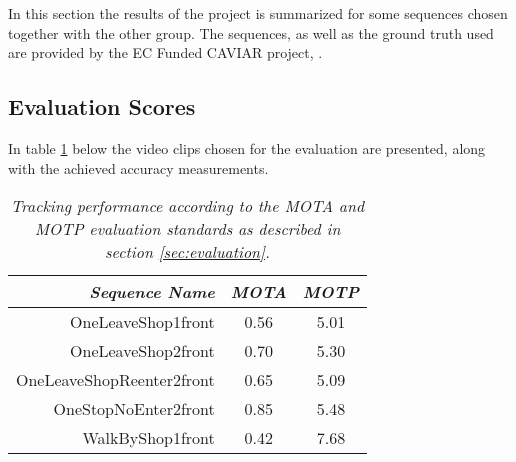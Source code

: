 In this section the results of the project is summarized for some sequences chosen together with the other group. The sequences, as well as the ground truth used are provided by the EC Funded CAVIAR project, \cite{CAVIAR}.

\subsection{Evaluation Scores}
In table \ref{tab:evaluation_performance} below the video clips chosen for the evaluation are presented, along with the achieved accuracy measurements.

\begin{table}[h]
\centering
	\begin{tabular}{r | c | c }
		\emph{Sequence Name}		& \emph{MOTA} & \emph{MOTP} \\
		\hline \hline
		OneLeaveShop1front			& 0.56 & 5.01 \\
		OneLeaveShop2front			& 0.70 & 5.30 \\
		OneLeaveShopReenter2front	& 0.65 & 5.09 \\
		OneStopNoEnter2front 		& 0.85 & 5.48 \\
		WalkByShop1front 			& 0.42 & 7.68 \\
	\end{tabular}
	\caption{\textit{Tracking performance according to the MOTA and MOTP evaluation standards as described in section \ref{sec:evaluation}.}}
	\label{tab:evaluation_performance}
\end{table}

